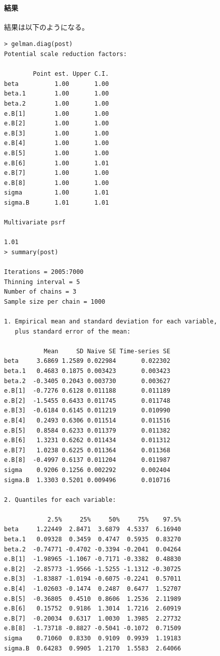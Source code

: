 \documentclass[11pt,uplatex]{jsarticle}
\begin{document}
\paragraph{結果}

結果は以下のようになる。

\begin{lstlisting}
> gelman.diag(post)
Potential scale reduction factors:

        Point est. Upper C.I.
beta          1.00       1.00
beta.1        1.00       1.00
beta.2        1.00       1.00
e.B[1]        1.00       1.00
e.B[2]        1.00       1.00
e.B[3]        1.00       1.00
e.B[4]        1.00       1.00
e.B[5]        1.00       1.00
e.B[6]        1.00       1.01
e.B[7]        1.00       1.00
e.B[8]        1.00       1.00
sigma         1.00       1.01
sigma.B       1.01       1.01

Multivariate psrf

1.01
> summary(post)

Iterations = 2005:7000
Thinning interval = 5 
Number of chains = 3 
Sample size per chain = 1000 

1. Empirical mean and standard deviation for each variable,
   plus standard error of the mean:

           Mean     SD Naive SE Time-series SE
beta     3.6869 1.2589 0.022984       0.022302
beta.1   0.4683 0.1875 0.003423       0.003423
beta.2  -0.3405 0.2043 0.003730       0.003627
e.B[1]  -0.7276 0.6128 0.011188       0.011189
e.B[2]  -1.5455 0.6433 0.011745       0.011748
e.B[3]  -0.6184 0.6145 0.011219       0.010990
e.B[4]   0.2493 0.6306 0.011514       0.011516
e.B[5]   0.8584 0.6233 0.011379       0.011382
e.B[6]   1.3231 0.6262 0.011434       0.011312
e.B[7]   1.0238 0.6225 0.011364       0.011368
e.B[8]  -0.4997 0.6137 0.011204       0.011987
sigma    0.9206 0.1256 0.002292       0.002404
sigma.B  1.3303 0.5201 0.009496       0.010716

2. Quantiles for each variable:

            2.5%     25%     50%     75%    97.5%
beta     1.22449  2.8471  3.6879  4.5337  6.16940
beta.1   0.09328  0.3459  0.4747  0.5935  0.83270
beta.2  -0.74771 -0.4702 -0.3394 -0.2041  0.04264
e.B[1]  -1.98965 -1.1067 -0.7171 -0.3382  0.48830
e.B[2]  -2.85773 -1.9566 -1.5255 -1.1312 -0.30725
e.B[3]  -1.83887 -1.0194 -0.6075 -0.2241  0.57011
e.B[4]  -1.02603 -0.1474  0.2487  0.6477  1.52707
e.B[5]  -0.36805  0.4510  0.8606  1.2536  2.11989
e.B[6]   0.15752  0.9186  1.3014  1.7216  2.60919
e.B[7]  -0.20034  0.6317  1.0030  1.3985  2.27732
e.B[8]  -1.73718 -0.8827 -0.5041 -0.1072  0.71509
sigma    0.71060  0.8330  0.9109  0.9939  1.19183
sigma.B  0.64283  0.9905  1.2170  1.5583  2.64066

\end{lstlisting}
\end{document}

